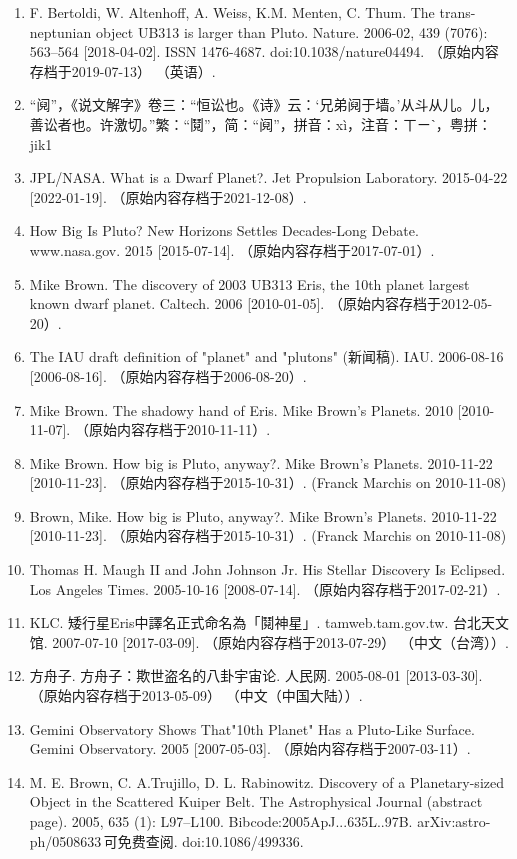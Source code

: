 \begin{enumerate}
\item F. Bertoldi, W. Altenhoff, A. Weiss, K.M. Menten, C. Thum. The trans-neptunian object UB313 is larger than Pluto. Nature. 2006-02, 439 (7076): 563–564 [2018-04-02]. ISSN 1476-4687. doi:10.1038/nature04494. （原始内容存档于2019-07-13） （英语）.
\item “阋”，《说文解字》卷三：“恒讼也。《诗》云：‘兄弟阋于墙。’从斗从儿。儿，善讼者也。许激切。”繁：“鬩”，简：“阋”，拼音：xì，注音：ㄒㄧˋ，粤拼：jik1
\item JPL/NASA. What is a Dwarf Planet?. Jet Propulsion Laboratory. 2015-04-22 [2022-01-19]. （原始内容存档于2021-12-08）.
\item How Big Is Pluto? New Horizons Settles Decades-Long Debate. www.nasa.gov. 2015 [2015-07-14]. （原始内容存档于2017-07-01）.
\item Mike Brown. The discovery of 2003 UB313 Eris, the 10th planet largest known dwarf planet. Caltech. 2006 [2010-01-05]. （原始内容存档于2012-05-20）.
\item The IAU draft definition of "planet" and "plutons" (新闻稿). IAU. 2006-08-16 [2006-08-16]. （原始内容存档于2006-08-20）.
\item Mike Brown. The shadowy hand of Eris. Mike Brown's Planets. 2010 [2010-11-07]. （原始内容存档于2010-11-11）.
\item Mike Brown. How big is Pluto, anyway?. Mike Brown's Planets. 2010-11-22 [2010-11-23]. （原始内容存档于2015-10-31）. (Franck Marchis on 2010-11-08)
\item Brown, Mike. How big is Pluto, anyway?. Mike Brown's Planets. 2010-11-22 [2010-11-23]. （原始内容存档于2015-10-31）. (Franck Marchis on 2010-11-08)
\item Thomas H. Maugh II and John Johnson Jr. His Stellar Discovery Is Eclipsed. Los Angeles Times. 2005-10-16 [2008-07-14]. （原始内容存档于2017-02-21）.
\item KLC. 矮行星Eris中譯名正式命名為「鬩神星」. tamweb.tam.gov.tw. 台北天文馆. 2007-07-10 [2017-03-09]. （原始内容存档于2013-07-29） （中文（台湾））.
\item 方舟子. 方舟子：欺世盗名的八卦宇宙论. 人民网. 2005-08-01 [2013-03-30]. （原始内容存档于2013-05-09） （中文（中国大陆））.
\item Gemini Observatory Shows That"10th Planet" Has a Pluto-Like Surface. Gemini Observatory. 2005 [2007-05-03]. （原始内容存档于2007-03-11）.
\item M. E. Brown, C. A.Trujillo, D. L. Rabinowitz. Discovery of a Planetary-sized Object in the Scattered Kuiper Belt. The Astrophysical Journal (abstract page). 2005, 635 (1): L97–L100. Bibcode:2005ApJ...635L..97B. arXiv:astro-ph/0508633 可免费查阅. doi:10.1086/499336.

\end{enumerate}
